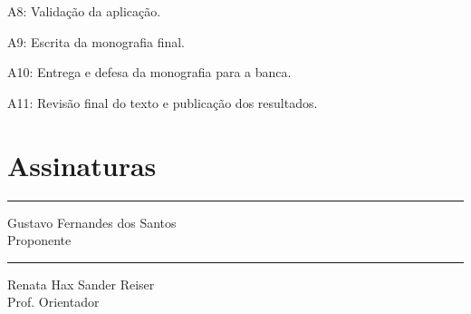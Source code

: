 \documentclass[tcc-proposta]{texufpel}
\begin{document}
	A8: Validação da aplicação.
	
	A9: Escrita da monografia final.
	
	A10: Entrega  e defesa  da monografia para a banca.
	
	A11: Revisão final do texto e publicação dos resultados.
	
	


	
\chapter{Assinaturas}
\vspace{2cm}
	
\begin{center}
\rule{8cm}{.3mm}
\medskip
	
	Gustavo Fernandes dos Santos\\
	Proponente
	
\end{center}
	
\vspace{4cm}
	
\begin{center}
\rule{8cm}{.3mm}
\medskip
	
	Renata Hax Sander Reiser\\
	Prof. Orientador
	
\end{center}
\end{document}
